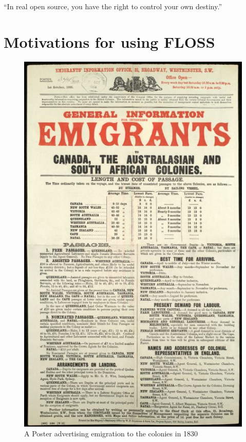 \newpage
\begin{savequote}[108mm]
``In real open source, you have the right to control your own destiny.''
\end{savequote}
\chapter{Motivations for using FLOSS}
\label{chap:Motivations}
\vspace{-2cm}

    \begin{figure}

     \includegraphics[scale=1.8]{img/Canadaemigration.png}
   \caption  [A Poster advertising emigration to the colonies in 1830]{ {A Poster advertising emigration to the colonies in 1830 \protect\footnotemark} } 
   \end{figure} 
 
